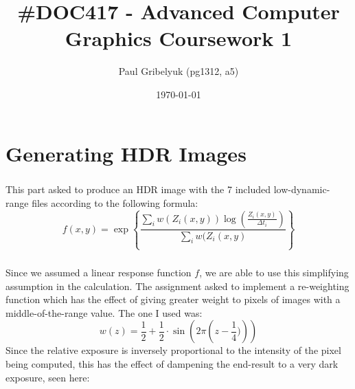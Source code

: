 \documentclass[a4paper,12pt,oneside,final]{report}
\author{Paul Gribelyuk (pg1312, a5)}
\title{\Huge \#DOC417 - Advanced Computer Graphics Coursework 1}
\date{\today}
\begin{document}
\maketitle
\listoffigures
\chapter{Generating HDR Images}
\paragraph{}
This part asked to produce an HDR image with the 7 included low-dynamic-range files according to the following formula:
$$
f(x,y) = \exp\left\{\frac{\sum_i w(Z_i(x,y))\log\left(\frac{Z_i(x,y)}{\Delta t_i}\right)}{\sum_i w(Z_i(x,y)}\right\}
$$
\paragraph{}
Since we assumed a linear response function $f$, we are able to use this simplifying assumption in the calculation.  The assignment asked to implement a re-weighting function which has the effect of giving greater weight to pixels of images with a middle-of-the-range value.  The one I used was:
$$
w(z) = \frac{1}{2} + \frac{1}{2}\cdot\sin\left(2\pi\left(z - \frac{1}{4})\right)\right)
$$
 Since the relative exposure is inversely proportional to the intensity of the pixel being computed, this has the effect of dampening the end-result to a very dark exposure, seen here:
\end{document}
